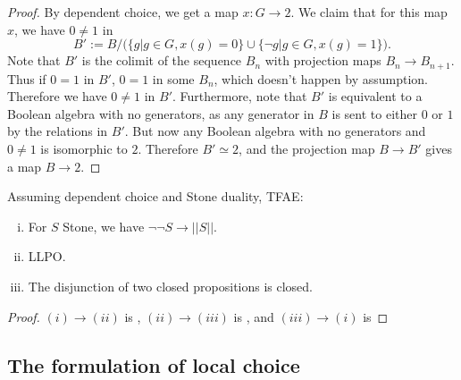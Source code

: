 \begin{proof}
  By dependent choice, we get a map $x:G\to 2$. 
  We claim that for this map $x$, we have $0\neq 1$ in 
  \begin{equation}
    B' := B/\big( \{g|g\in G, x(g) = 0\} \cup \{ \neg g| g\in G, x(g) = 1\}\big).
  \end{equation}
  Note that $B'$ is the colimit of the sequence $B_n$ with projection maps $B_n \to B_{n+1}$. 
  Thus if $0=1$ in $B'$, $0=1$ in some $B_n$, which doesn't happen by assumption. 
  Therefore we have $0\neq 1$ in $B'$. 
  Furthermore, note that $B'$ is equivalent to a Boolean algebra with no generators, 
  as any generator in $B$ is sent to either $0$ or $1$ by the relations in $B'$. 
%
  But now any Boolean algebra with no generators and $0\neq 1$ is isomorphic to $2$. 
  Therefore $B'\simeq 2$, and the projection map $B\to B'$ gives a map $B \to 2$. 
  
\end{proof}

\begin{corollary}
Assuming dependent choice and Stone duality, TFAE:
\begin{enumerate}[(i)]
  \item For $S$ Stone, we have $\neg \neg S \to ||S||$. 
  \item LLPO.
  \item The disjunction of two closed propositions is closed. 
\end{enumerate}
\end{corollary}
\begin{proof}
  $(i) \to (ii)$ is , $(ii) \to (iii)$ is , 
  and $(iii) \to (i)$ is 
\end{proof}


\subsection{The formulation of local choice}

